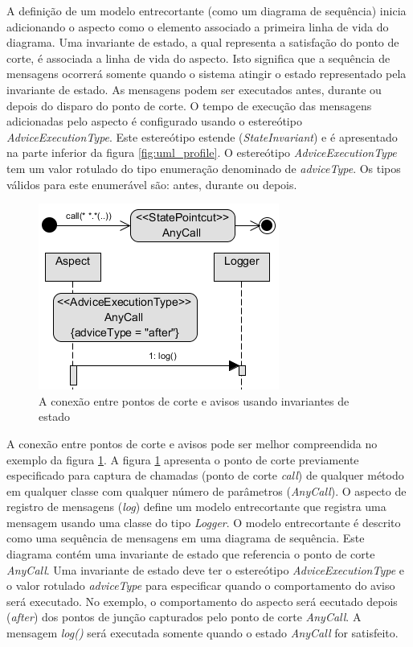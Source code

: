 A definição de um modelo entrecortante (como um diagrama de sequência) inicia adicionando o aspecto como o elemento associado a primeira linha de vida
do diagrama. Uma invariante de estado, a qual representa a satisfação do ponto de corte, é associada a linha de vida do aspecto. Isto significa que a
sequência de mensagens ocorrerá somente quando o sistema atingir o estado representado pela invariante de estado. As mensagens podem ser executados
antes, durante ou depois do disparo do ponto de corte. O tempo de execução das mensagens adicionadas pelo aspecto é configurado usando o estereótipo
\textit{AdviceExecutionType}. Este estereótipo estende (\textit{StateInvariant}) e é apresentado na parte inferior da figura \ref{fig:uml_profile}. O
estereótipo \textit{AdviceExecutionType} tem um valor rotulado do tipo enumeração denominado de \textit{adviceType}. Os tipos válidos para este enumerável são:
antes, durante ou depois.

\begin{figure}
	\centering
	\includegraphics{img/behavioral_profile_example.png}
	\caption{A conexão entre pontos de corte e avisos usando invariantes de estado}\label{fig:behavioral_profile_example}
\end{figure}

A conexão entre pontos de corte e avisos pode ser melhor compreendida no exemplo da figura \ref{fig:behavioral_profile_example}. A figura
\ref{fig:behavioral_profile_example} apresenta o ponto de corte previamente especificado para captura de chamadas (ponto de corte \textit{call}) de
qualquer método em qualquer classe com qualquer número de parâmetros (\textit{AnyCall}). O aspecto de registro de mensagens (\textit{log}) define um
modelo entrecortante que registra uma mensagem usando uma classe do tipo \textit{Logger}. O modelo entrecortante é descrito como uma sequência de
mensagens em uma diagrama de sequência. Este diagrama contém uma invariante de estado que referencia o ponto de corte \textit{AnyCall}. Uma invariante
de estado deve ter o estereótipo \textit{AdviceExecutionType} e o valor rotulado \textit{adviceType} para especificar quando o comportamento do aviso
será executado. No exemplo, o comportamento do aspecto será eecutado depois (\textit{after}) dos pontos de junção capturados pelo ponto de corte
\textit{AnyCall}. A mensagem \textit{log()} será executada somente quando o estado \textit{AnyCall} for satisfeito.


